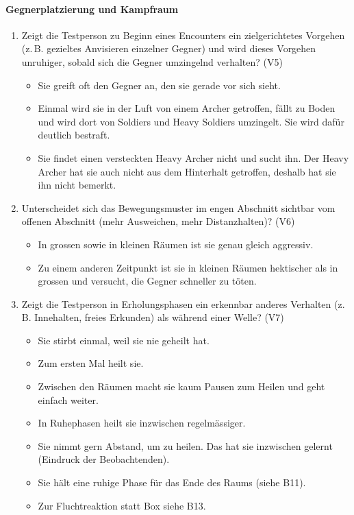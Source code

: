 \documentclass[../Main.tex]{subfiles}
\begin{document}
\paragraph{Gegnerplatzierung und Kampfraum}
\begin{enumerate}[label=\textbf{B\arabic*}, leftmargin=1.5cm, itemsep=0.8em, resume]
\item Zeigt die Testperson zu Beginn eines Encounters ein zielgerichtetes Vorgehen (z.\,B. gezieltes Anvisieren einzelner Gegner) und wird dieses Vorgehen unruhiger, sobald sich die Gegner umzingelnd verhalten? \hfill (V5)
    \begin{itemize}[nosep]
        \item Sie greift oft den Gegner an, den sie gerade vor sich sieht.
        \item Einmal wird sie in der Luft von einem Archer getroffen, fällt zu Boden und wird dort von Soldiers und Heavy Soldiers umzingelt. Sie wird dafür deutlich bestraft.
        \item Sie findet einen versteckten Heavy Archer nicht und sucht ihn. Der Heavy Archer hat sie auch nicht aus dem Hinterhalt getroffen, deshalb hat sie ihn nicht bemerkt.
    \end{itemize}

\item Unterscheidet sich das Bewegungsmuster im engen Abschnitt sichtbar vom offenen Abschnitt (mehr Ausweichen, mehr Distanzhalten)? \hfill (V6)
    \begin{itemize}[nosep]
        \item In grossen sowie in kleinen Räumen ist sie genau gleich aggressiv.
        \item Zu einem anderen Zeitpunkt ist sie in kleinen Räumen hektischer als in grossen und versucht, die Gegner schneller zu töten.
    \end{itemize}

\item Zeigt die Testperson in Erholungsphasen ein erkennbar anderes Verhalten (z.\,B. Innehalten, freies Erkunden) als während einer Welle? \hfill (V7)
    \begin{itemize}[nosep]
        \item Sie stirbt einmal, weil sie nie geheilt hat.
        \item Zum ersten Mal heilt sie.
        \item Zwischen den Räumen macht sie kaum Pausen zum Heilen und geht einfach weiter.
        \item In Ruhephasen heilt sie inzwischen regelmässiger.
        \item Sie nimmt gern Abstand, um zu heilen. Das hat sie inzwischen gelernt (Eindruck der Beobachtenden).
        \item Sie hält eine ruhige Phase für das Ende des Raums (siehe B11).
        \item Zur Fluchtreaktion statt Box siehe B13.
    \end{itemize}


\end{enumerate}
\end{document}
